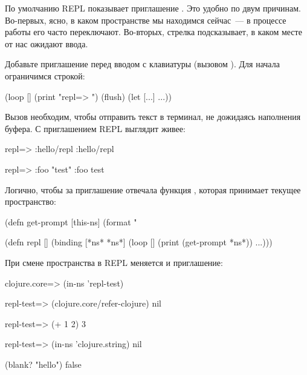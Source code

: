 
По умолчанию REPL показывает приглашение . Это удобно по двум причинам. Во-первых, ясно, в каком пространстве мы находимся сейчас~--- в процессе работы его часто переключают. Во-вторых, стрелка подсказывает, в каком месте от нас ожидают ввода.

Добавьте приглашение перед вводом с клавиатуры (вызовом ). Для начала ограничимся строкой:

\begin{english}
  \begin{clojure}
(loop []
  (print "repl=> ")
  (flush)
  (let [...]
    ...))
  \end{clojure}
\end{english}

Вызов  необходим, чтобы отправить текст в терминал, не дожидаясь наполнения буфера. С приглашением REPL выглядит живее:

\begin{english}
  \begin{clojure}
repl=> :hello/repl
:hello/repl

repl=> {:foo "test"}
{:foo test}
  \end{clojure}
\end{english}

Логично, чтобы за приглашение отвечала функция , которая принимает текущее пространство:

\begin{english}
  \begin{clojure/lines}
(defn get-prompt
  [this-ns]
  (format "%

(defn repl
  []
  (binding [*ns* *ns*]
    (loop []
      (print (get-prompt *ns*))
      ...)))
  \end{clojure/lines}
\end{english}

\pagebreaklarge

При смене пространства в REPL меняется и приглашение:

\begin{english}
  \begin{clojure}
clojure.core=> (in-ns 'repl-test)

repl-test=> (clojure.core/refer-clojure)
nil

repl-test=> (+ 1 2)
3

repl-test=> (in-ns 'clojure.string)
nil

(blank? "hello")
false
  \end{clojure}
\end{english}

